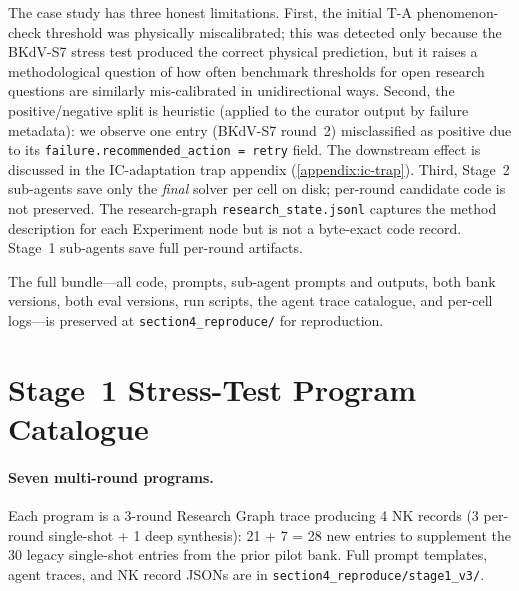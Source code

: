 The case study has three honest limitations. First, the initial T-A
phenomenon-check threshold was physically miscalibrated; this was detected
only because the BKdV-S7 stress test produced the correct physical
prediction, but it raises a methodological question of how often benchmark
thresholds for open research questions are similarly mis-calibrated in
unidirectional ways. Second, the positive/negative split is heuristic
(applied to the curator output by failure metadata): we observe one entry
(BKdV-S7 round~2) misclassified as positive due to its
\texttt{failure.recommended\_action = retry} field. The downstream effect is
discussed in the IC-adaptation trap appendix
(\cref{appendix:ic-trap}). Third, Stage~2 sub-agents save only the
\emph{final} solver per cell on disk; per-round candidate code is not
preserved. The research-graph \texttt{research\_state.jsonl} captures the
method description for each Experiment node but is not a byte-exact code
record. Stage~1 sub-agents save full per-round artifacts.

The full bundle---all code, prompts, sub-agent prompts and outputs, both
bank versions, both eval versions, run scripts, the agent trace catalogue,
and per-cell logs---is preserved at \texttt{section4\_reproduce/} for
reproduction.


\section{Stage~1 Stress-Test Program Catalogue}
\label{appendix:bkdv-bank}

\paragraph{Seven multi-round programs.} Each program is a 3-round Research
Graph trace producing 4 NK records (3 per-round single-shot + 1 deep
synthesis): 21 + 7 = 28 new entries to supplement the 30 legacy single-shot
entries from the prior pilot bank. Full prompt templates, agent traces, and
NK record JSONs are in \texttt{section4\_reproduce/stage1\_v3/}.

